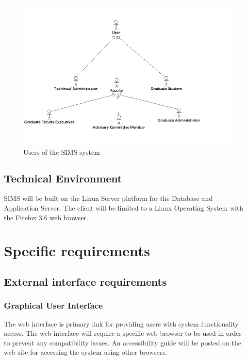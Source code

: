 \documentclass{journal}
\begin{document}
\begin{figure}[!h]
\begin{center}
\includegraphics[width=468px]{diagrams/use_cases/UserHeirachy_uc} \caption{ Users of the SIMS system } \label{fig:Users}

\end{center}
\end{figure}



\subsection{Technical Environment}

SIMS will be built on the Linux Server platform for the Database and Application Server. The client will be limited to a Linux Operating System with the Firefox 3.6 web browser.  

\section{Specific requirements}
\subsection{External interface requirements}
\subsubsection{ Graphical User Interface }
The web interface is primary link for providing users with system functionality access. The web interface will require a specific web browser to be used in order to prevent any compatibility issues. An accessibility guide will be posted on the web site for accessing the system using other browsers. 
\end{document}
